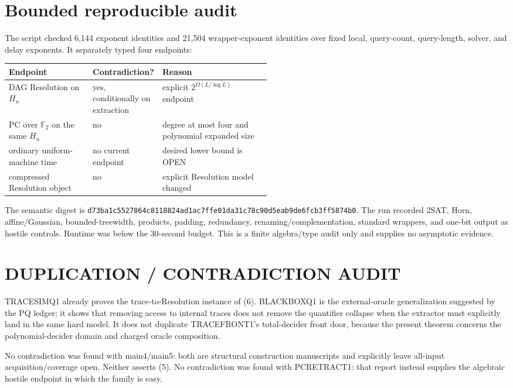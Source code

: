 \documentclass[11pt]{article}
\begin{document}
\section{Bounded reproducible audit}
The script
 checked
6,144 exponent identities and 21,504 wrapper-exponent identities over fixed
local, query-count, query-length, solver, and delay exponents.  It separately
typed four endpoints:
\begin{center}
\begin{tabularx}{0.95\linewidth}{@{}p{0.32\linewidth}p{0.20\linewidth}X@{}}
\toprule
Endpoint & Contradiction? & Reason\\
\midrule
DAG Resolution on $H_n$ & yes, conditionally on extraction & explicit
$2^{\Omega(L/\log L)}$ endpoint\\
PC over $\mathbb F_2$ on the same $H_n$ & no & degree at most four and
polynomial expanded size\\
ordinary uniform-machine time & no current endpoint & desired lower bound is
OPEN\\
compressed Resolution object & no & explicit Resolution model changed\\
\bottomrule
\end{tabularx}
\end{center}
The semantic digest is
\texttt{d73ba1c5527864c8118824ad1ac7ffe01da31c78c90d5eab9de6fcb3ff5874b0}.
The run recorded 2SAT, Horn, affine/Gaussian, bounded-treewidth, products,
padding, redundancy, renaming/complementation, standard wrappers, and one-bit
output as hostile controls.  Runtime was below the 30-second budget.  This is
a finite algebra/type audit only and supplies no asymptotic evidence.

\section{DUPLICATION / CONTRADICTION AUDIT}
TRACESIMQ1 already proves the trace-to-Resolution instance of (6).
BLACKBOXQ1 is the external-oracle generalization suggested by the PQ ledger;
it shows that removing access to internal traces does not remove the
quantifier collapse when the extractor must explicitly land in the same hard
model.  It does not duplicate TRACEFRONT1's total-decider front door, because
the present theorem concerns the polynomial-decider domain and charged oracle
composition.

No contradiction was found with main4/main5: both are structural construction
manuscripts and explicitly leave all-input acquisition/coverage open.  Neither
asserts (5).  No contradiction was found with PCRETRACT1: that report instead
supplies the algebraic hostile endpoint in which the family is easy.
\end{document}
